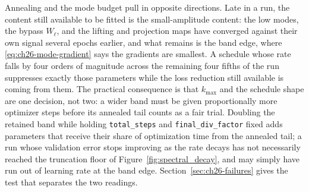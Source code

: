 Annealing and the mode budget pull in opposite directions. Late in a run, the content still
available to be fitted is the small-amplitude content: the low modes, the bypass $W_\ell$,
and the lifting and projection maps have converged against their own signal several epochs
earlier, and what remains is the band edge, where \eqref{eq:ch26-mode-gradient} says the
gradients are smallest. A schedule whose rate falls by four orders of magnitude across the
remaining four fifths of the run suppresses exactly those parameters while the loss
reduction still available is coming from them. The practical consequence is that $k_{\max}$
and the schedule shape are one decision, not two: a wider band must be given proportionally
more optimizer steps before its annealed tail counts as a fair trial. Doubling the retained band while holding \texttt{total\_steps}
and \texttt{final\_div\_factor} fixed adds parameters that receive their share of
optimization time from the annealed tail; a run whose validation error stops improving as
the rate decays has not necessarily reached the truncation floor of
Figure~\ref{fig:spectral_decay}, and may simply have run out of learning rate at the band
edge. Section~\ref{sec:ch26-failures} gives the test that separates the two readings.

